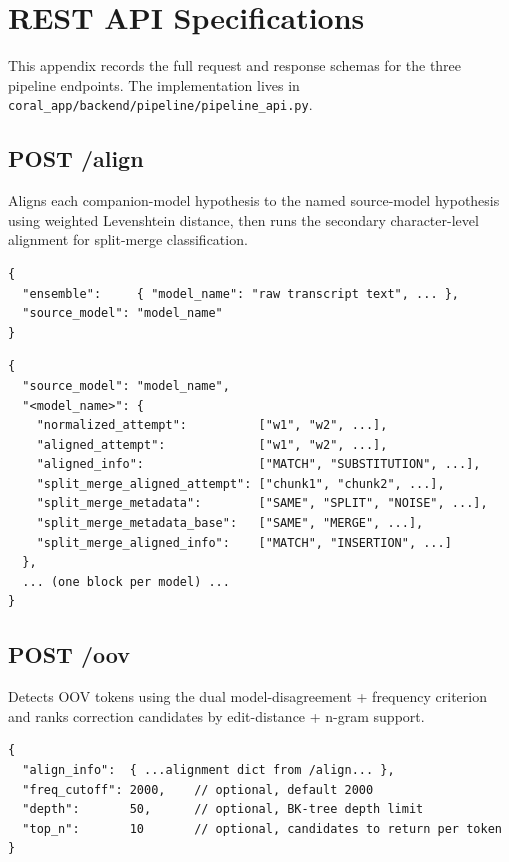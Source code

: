 \chapter{REST API Specifications}
\label{app:api-spec}

This appendix records the full request and response schemas for the three pipeline endpoints. The implementation lives in \texttt{coral\_app/backend/pipeline/pipeline\_api.py}.

\section{POST /align}
\label{app:align}

Aligns each companion-model hypothesis to the named source-model hypothesis using weighted Levenshtein distance, then runs the secondary character-level alignment for split-merge classification.

\begin{lstlisting}[caption={Request body schema for \texttt{POST /align}.}]
{
  "ensemble":     { "model_name": "raw transcript text", ... },
  "source_model": "model_name"
}
\end{lstlisting}

\begin{lstlisting}[caption={Response body schema for \texttt{POST /align}.}]
{
  "source_model": "model_name",
  "<model_name>": {
    "normalized_attempt":          ["w1", "w2", ...],
    "aligned_attempt":             ["w1", "w2", ...],
    "aligned_info":                ["MATCH", "SUBSTITUTION", ...],
    "split_merge_aligned_attempt": ["chunk1", "chunk2", ...],
    "split_merge_metadata":        ["SAME", "SPLIT", "NOISE", ...],
    "split_merge_metadata_base":   ["SAME", "MERGE", ...],
    "split_merge_aligned_info":    ["MATCH", "INSERTION", ...]
  },
  ... (one block per model) ...
}
\end{lstlisting}

\section{POST /oov}
\label{app:oov}

Detects OOV tokens using the dual model-disagreement + frequency criterion and ranks correction candidates by edit-distance + n-gram support.

\begin{lstlisting}[caption={Request body schema for \texttt{POST /oov}.}]
{
  "align_info":  { ...alignment dict from /align... },
  "freq_cutoff": 2000,    // optional, default 2000
  "depth":       50,      // optional, BK-tree depth limit
  "top_n":       10       // optional, candidates to return per token
}
\end{lstlisting}

